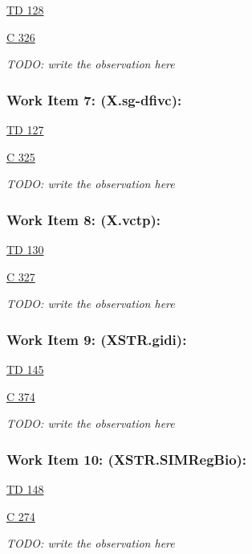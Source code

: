 \href{https://www.itu.int/md/meetingdoc.asp?lang=en\&parent=T25-SG17-251203-TD-WP1-0128}{TD 128}

\href{https://www.itu.int/md/meetingdoc.asp?lang=en\&parent=T25-SG17-C-0326}{C 326 }

\textit{TODO: write the observation here}

\subsubsection{Work Item 7: (X.sg-dfivc):}

\href{https://www.itu.int/md/meetingdoc.asp?lang=en\&parent=T25-SG17-251203-TD-WP1-0127}{TD 127}

\href{https://www.itu.int/md/meetingdoc.asp?lang=en\&parent=T25-SG17-C-0325}{C 325 }

\textit{TODO: write the observation here}

\subsubsection{Work Item 8: (X.vctp):}

\href{https://www.itu.int/md/meetingdoc.asp?lang=en\&parent=T25-SG17-251203-TD-WP1-0130}{TD 130}

\href{https://www.itu.int/md/meetingdoc.asp?lang=en\&parent=T25-SG17-C-0327}{C 327 }

\textit{TODO: write the observation here}

\subsubsection{Work Item 9: (XSTR.gidi):}

\href{https://www.itu.int/md/meetingdoc.asp?lang=en\&parent=T25-SG17-251203-TD-WP1-0145}{TD 145}

\href{https://www.itu.int/md/meetingdoc.asp?lang=en\&parent=T25-SG17-C-0374}{C 374 }

\textit{TODO: write the observation here}

\subsubsection{Work Item 10: (XSTR.SIMRegBio):}

\href{https://www.itu.int/md/meetingdoc.asp?lang=en\&parent=T25-SG17-251203-TD-WP1-0148}{TD 148}

\href{https://www.itu.int/md/meetingdoc.asp?lang=en\&parent=T25-SG17-C-0274}{C 274 }

\textit{TODO: write the observation here}
